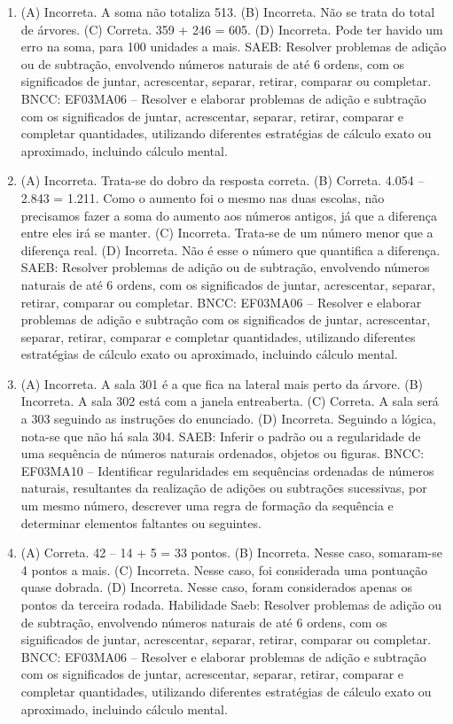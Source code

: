 \begin{enumerate}
\item
(A) Incorreta. A soma não totaliza 513.
(B) Incorreta. Não se trata do total de árvores.
(C) Correta. 359 + 246 = 605.
(D) Incorreta. Pode ter havido um erro na soma, para 100 unidades a mais.
SAEB: Resolver problemas de adição ou de subtração,
envolvendo números naturais de até 6 ordens, com os significados de
juntar, acrescentar, separar, retirar, comparar ou completar.
BNCC: EF03MA06 – Resolver e elaborar problemas de adição e subtração com os significados de
juntar, acrescentar, separar, retirar, comparar e completar quantidades, utilizando diferentes
estratégias de cálculo exato ou aproximado, incluindo cálculo mental.

\item
(A) Incorreta. Trata-se do dobro da resposta correta.
(B) Correta. 4.054 -- 2.843 = 1.211. Como o aumento foi o mesmo nas duas escolas, não
precisamos fazer a soma do aumento aos números antigos, já que a diferença entre eles irá se manter.
(C) Incorreta. Trata-se de um número menor que a diferença real.
(D) Incorreta. Não é esse o número que quantifica a diferença.
SAEB: Resolver problemas de adição ou de subtração,
envolvendo números naturais de até 6 ordens, com os significados de
juntar, acrescentar, separar, retirar, comparar ou completar.
BNCC: EF03MA06 – Resolver e elaborar problemas de adição e subtração com os significados de
juntar, acrescentar, separar, retirar, comparar e completar quantidades, utilizando diferentes
estratégias de cálculo exato ou aproximado, incluindo cálculo mental.

\item
(A) Incorreta. A sala 301 é a que fica na lateral mais perto da árvore.
(B) Incorreta. A sala 302 está com a janela entreaberta.
(C) Correta. A sala será a 303 seguindo as instruções do enunciado.
(D) Incorreta. Seguindo a lógica, nota-se que não há sala 304.
SAEB: Inferir o padrão ou a regularidade de uma sequência de
números naturais ordenados, objetos ou figuras.
BNCC: EF03MA10 -- Identificar regularidades em sequências ordenadas de números naturais,
resultantes da realização de adições ou subtrações sucessivas, por um mesmo número,
descrever uma regra de formação da sequência e determinar elementos faltantes ou seguintes.

\item
(A) Correta. 42 -- 14 + 5 = 33 pontos.
(B) Incorreta. Nesse caso, somaram-se 4 pontos a mais.
(C) Incorreta. Nesse caso, foi considerada uma pontuação quase dobrada.
(D) Incorreta. Nesse caso, foram considerados apenas os pontos da terceira rodada.
Habilidade Saeb: Resolver problemas de adição ou de subtração,
envolvendo números naturais de até 6 ordens, com os significados de
juntar, acrescentar, separar, retirar, comparar ou completar.
BNCC: EF03MA06 – Resolver e elaborar problemas de adição e subtração com os significados de
juntar, acrescentar, separar, retirar, comparar e completar quantidades, utilizando diferentes
estratégias de cálculo exato ou aproximado, incluindo cálculo mental.


\end{enumerate}
